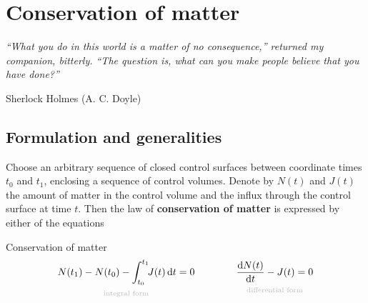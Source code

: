 \documentclass[a4paper,12pt,%
onecolumn,oneside,titlepage,%
british%
]{memoir}
\newcommand*{\di}{\mathrm{d}}%
\renewcommand*{\|}[1][]{\nonscript\:#1\vert\nonscript\:\mathopen{}}
\newcommand*{\yN}{N}
\newcommand*{\yJ}{J}
\newcommand*{\yti}{t_{0}}
\newcommand*{\ytf}{t_{1}}
\begin{document}
%

\printpagenotes*
\fi

\iffalse
\printpagenotes*
\clearpage
\chapter{Conservation of matter}
\label{ncha:cons_matter}

\epigraph{\emph{%
\enquote{What you do in this world is a matter of no consequence,} returned my companion, bitterly. \enquote{The question is, what can you make people believe that you have done?\textellipsis}%
}}{Sherlock Holmes (A. C. Doyle) \cites*{doyle1887}}

\section{Formulation and generalities}
\label{nsec:cons_matter_formulation}

Choose an arbitrary sequence of closed control surfaces between coordinate times $\yti$ and $\ytf$, enclosing a sequence of control volumes. Denote by $\yN(t)$ and $\yJ(t)$ the amount of matter in the control volume and the influx through the control surface at time $t$. Then the law of \textbf{conservation of matter} is expressed by either of the equations
\begin{definition}{Conservation of matter}
  \begin{equation}
    \label{neq:cons_matter}
    \begin{gathered}
      \underbracket[0pt]{\yN(\ytf) - \yN(\yti) - \int_{\yti}^{\ytf}\!\!\yJ(t)\,\di t = 0}_{\mathclap{\text{\color{grey}integral form}}}
      \qquad%
      \qquad
      \underbracket[0pt]{\frac{\di\yN(t)}{\di t} - \yJ(t) = 0}_{\mathclap{\text{\color{grey}differential form}}}
    \end{gathered}
  \end{equation}
\end{definition}
\end{document}
